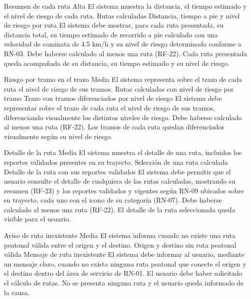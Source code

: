  {Resumen de cada ruta}%
  {Alta}%
  {El sistema muestra la distancia, el tiempo estimado y el nivel de riesgo de cada ruta.}%
  {Rutas calculadas}%
  {Distancia, tiempo a pie y nivel de riesgo por ruta}%
  {El sistema debe mostrar, para cada ruta presentada, su distancia total, su tiempo estimado de recorrido a pie calculado con una velocidad de caminata de 4.5 km/h y su nivel de riesgo determinado conforme a RN-03.}%
  {Debe haberse calculado al menos una ruta (RF-22).}%
  {Cada ruta presentada queda acompañada de su distancia, su tiempo estimado y su nivel de riesgo.}%

  {Riesgo por tramo en el trazo}%
  {Media}%
  {El sistema representa sobre el trazo de cada ruta el nivel de riesgo de sus tramos.}%
  {Rutas calculadas con nivel de riesgo por tramo}%
  {Trazo con tramos diferenciados por nivel de riesgo}%
  {El sistema debe representar sobre el trazo de cada ruta el nivel de riesgo de sus tramos, diferenciando visualmente los distintos niveles de riesgo.}%
  {Debe haberse calculado al menos una ruta (RF-22).}%
  {Los tramos de cada ruta quedan diferenciados visualmente según su nivel de riesgo.}%

  {Detalle de la ruta}%
  {Media}%
  {El sistema muestra el detalle de una ruta, incluidos los reportes validados presentes en su trayecto.}%
  {Selección de una ruta calculada}%
  {Detalle de la ruta con sus reportes validados}%
  {El sistema debe permitir que el usuario consulte el detalle de cualquiera de las rutas calculadas, mostrando su resumen (RF-23) y los reportes validados y vigentes según RN-09 ubicados sobre su trayecto, cada uno con el icono de su categoría (RN-07).}%
  {Debe haberse calculado al menos una ruta (RF-22).}%
  {El detalle de la ruta seleccionada queda visible para el usuario.}%

  {Aviso de ruta inexistente}%
  {Media}%
  {El sistema informa cuando no existe una ruta peatonal válida entre el origen y el destino.}%
  {Origen y destino sin ruta peatonal válida}%
  {Mensaje de ruta inexistente}%
  {El sistema debe informar al usuario, mediante un mensaje claro, cuando no exista ninguna ruta peatonal que conecte el origen y el destino dentro del área de servicio de RN-01.}%
  {El usuario debe haber solicitado el cálculo de rutas.}%
  {No se presenta ninguna ruta y el usuario queda informado de la causa.}%

